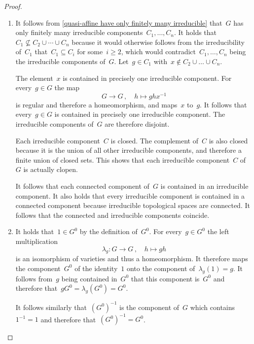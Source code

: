 \begin{proof}
  \leavevmode
  \begin{enumerate}
    \item
      It follows from \cref{quasi-affine have only finitely many irreducible} that~$G$ has only finitely many irreducible components~$C_1, \dotsc, C_n$.
      It holds that~$C_1 \nsubseteq C_2 \cup \dotsb \cup C_n$ because it would otherwise follows from the irreducibility of~$C_1$ that~$C_1 \subseteq C_i$ for some~$i \geq 2$, which would contradict~$C_1, \dotsc, C_n$ being the irreducible components of~$G$.
      Let~$g \in C_1$ with~$x \notin C_2 \cup \dotsc \cup C_n$.
      
      The element~$x$ is contained in precisely one irreducible component.
      For every~$g \in G$ the map
      \[
                G
        \to     G \,,
        \quad   h
        \mapsto g h x^{-1}
      \]
      is regular and therefore a homeomorphism, and maps~$x$ to~$g$.
      It follows that every~$g \in G$ is contained in precisely one irreducible component.
      The irreducible components of~$G$ are therefore disjoint.
      
      Each irreducible component~$C$ is closed.
      The complement of~$C$ is also closed because it is the union of all other irreducible components, and therefore a finite union of closed sets.
      This shows that each irreducible component~$C$ of~$G$ is actually clopen.
      
      It follows that each connected component of~$G$ is contained in an irreducible component.
      It also holds that every irreducible component is contained in a connected component because irreducible topological spaces are connected.
      It follows that the connected and irreducible components coincide.
    \item
      It holds that~$1 \in G^0$ by the definition of~$G^0$.
      For every~$g \in G^0$ the left multiplication
      \[
                \lambda_g
        \colon  G
        \to     G \,,
        \quad   h
        \mapsto gh
      \]
      is an isomorphism of varieties and thus a homeomorphism.
      It therefore maps the component~$G^0$ of the identity~$1$ onto the component of~$\lambda_g(1) = g$.
      It follows from~$g$ being contained in~$G^0$ that this component is~$G^0$ and therefore that~$g G^0 = \lambda_g( G^0 ) = G^0$.
      
      It follows similarly that~$(G^0)^{-1}$ is the component of~$G$ which contains~$1^{-1} = 1$ and therefore that~$(G^0)^{-1} = G^0$.
      

\end{enumerate}
\end{proof}
